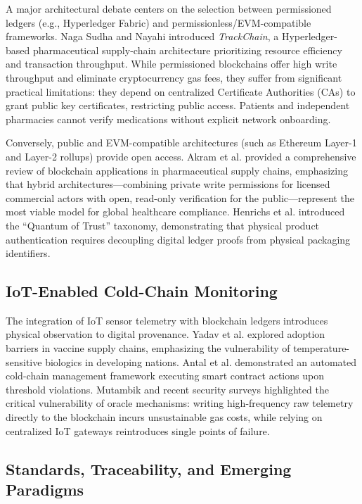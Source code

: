 \documentclass[pdflatex,sn-mathphys-num]{sn-jnl}
\theoremstyle{thmstyleone}
\theoremstyle{thmstyletwo}
\theoremstyle{thmstylethree}
\begin{document}
A major architectural debate centers on the selection between permissioned ledgers (e.g., Hyperledger Fabric) and permissionless/EVM-compatible frameworks. Naga Sudha and Nayahi \cite{nagasudha2024trackchain} introduced \textit{TrackChain}, a Hyperledger-based pharmaceutical supply-chain architecture prioritizing resource efficiency and transaction throughput. While permissioned blockchains offer high write throughput and eliminate cryptocurrency gas fees, they suffer from significant practical limitations: they depend on centralized Certificate Authorities (CAs) to grant public key certificates, restricting public access. Patients and independent pharmacies cannot verify medications without explicit network onboarding.

Conversely, public and EVM-compatible architectures (such as Ethereum Layer-1 and Layer-2 rollups) provide open access. Akram et al. \cite{akram2024blockchain} provided a comprehensive review of blockchain applications in pharmaceutical supply chains, emphasizing that hybrid architectures—combining private write permissions for licensed commercial actors with open, read-only verification for the public—represent the most viable model for global healthcare compliance. Henrichs et al. \cite{henrichs2025quantum} introduced the ``Quantum of Trust'' taxonomy, demonstrating that physical product authentication requires decoupling digital ledger proofs from physical packaging identifiers.

\subsection{IoT-Enabled Cold-Chain Monitoring}

The integration of IoT sensor telemetry with blockchain ledgers introduces physical observation to digital provenance. Yadav et al. \cite{yadav2022blockchain} explored adoption barriers in vaccine supply chains, emphasizing the vulnerability of temperature-sensitive biologics in developing nations. Antal et al. \cite{antal2018blockchain} demonstrated an automated cold-chain management framework executing smart contract actions upon threshold violations. Mutambik \cite{mutambik2026blockchain} and recent security surveys \cite{securitythreats2026} highlighted the critical vulnerability of oracle mechanisms: writing high-frequency raw telemetry directly to the blockchain incurs unsustainable gas costs, while relying on centralized IoT gateways reintroduces single points of failure.

\subsection{Standards, Traceability, and Emerging Paradigms}
\end{document}
